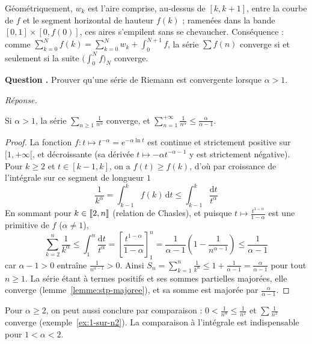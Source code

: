 \documentclass[11pt]{article}
\newcounter{qnum}
\newcommand{\question}[1]{%
\stepcounter{qnum}%
\bigskip
\noindent\textbf{Question \theqnum.} #1\par}
\newcommand{\reponse}{\noindent\textit{Réponse.}\ }
\begin{document}
\begin{remarque}
Géométriquement, $w_k$ est l'aire comprise, au-dessus de $[k,k+1]$, entre la courbe de $f$ et le segment horizontal de hauteur $f(k)$ ; ramenées dans la bande $[0,1]\times[0,f(0)]$, ces aires s'empilent sans se chevaucher. Conséquence : comme $\sum_{k=0}^Nf(k)=\sum_{k=0}^Nw_k+\int_0^{N+1}f$, la série $\sum f(n)$ converge si et seulement si la suite $\big(\int_0^Nf\big)_N$ converge.
\end{remarque}

\question{Prouver qu'une série de Riemann est convergente lorsque $\alpha>1$.}
\reponse

\begin{prop}
\label{prop:riemann-cv}
Si $\alpha>1$, la série $\sum_{n\geq1}\frac{1}{n^\alpha}$ converge, et $\sum_{n=1}^{+\infty}\frac{1}{n^\alpha}\leq\frac{\alpha}{\alpha-1}$.
\end{prop}

\begin{proof}
La fonction $f:t\mapsto t^{-\alpha}=e^{-\alpha\ln t}$ est continue et strictement positive sur $[1,+\infty[$, et décroissante (sa dérivée $t\mapsto-\alpha t^{-\alpha-1}$ y est strictement négative). Pour $k\geq 2$ et $t\in[k-1,k]$, on a $f(t)\geq f(k)$, d'où par croissance de l'intégrale sur ce segment de longueur $1$
\[\frac{1}{k^\alpha}=\int_{k-1}^kf(k)\,\mathrm{d}t\leq\int_{k-1}^k\frac{\mathrm{d}t}{t^\alpha}\]
En sommant pour $k\in\llbracket 2,n \rrbracket$ (relation de Chasles), et puisque $t\mapsto\frac{t^{1-\alpha}}{1-\alpha}$ est une primitive de $f$ ($\alpha\neq 1$),
\[\sum_{k=2}^n\frac{1}{k^\alpha}\leq\int_1^n\frac{\mathrm{d}t}{t^\alpha}=\left[\frac{t^{1-\alpha}}{1-\alpha}\right]_1^n=\frac{1}{\alpha-1}\left(1-\frac{1}{n^{\alpha-1}}\right)\leq\frac{1}{\alpha-1}\]
car $\alpha-1>0$ entraîne $\frac{1}{n^{\alpha-1}}>0$. Ainsi $S_n=\sum_{k=1}^n\frac{1}{k^\alpha}\leq 1+\frac{1}{\alpha-1}=\frac{\alpha}{\alpha-1}$ pour tout $n\geq 1$. La série étant à termes positifs et ses sommes partielles majorées, elle converge (lemme~\ref{lemme:stp-majoree}), et sa somme est majorée par $\frac{\alpha}{\alpha-1}$.
\end{proof}

\begin{remarque}
Pour $\alpha\geq 2$, on peut aussi conclure par comparaison : $0<\frac{1}{n^\alpha}\leq\frac{1}{n^2}$ et $\sum\frac{1}{n^2}$ converge (exemple~\ref{ex:1-sur-n2}). La comparaison à l'intégrale est indispensable pour $1<\alpha<2$.
\end{remarque}
\end{document}
